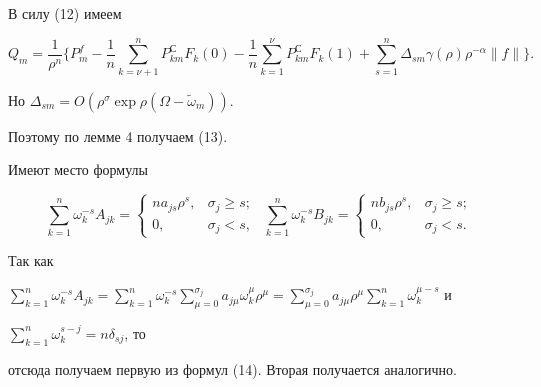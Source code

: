 \begin{pf}


В силу (12) имеем


$$


Q_m= \frac 1{\rho^n}\bigg\{P_m^f- \frac 1n\sum\limits_{k=\nu+1}^nP


_{km}^СF_k(0)- \frac 1n\sum\limits_{k=1}^{\nu}P_{km}^СF_k(1)+


\sum\limits_{s=1}^n\Delta_{sm}\gamma(\rho)\rho^{-\alpha}


\|f\|\bigg\}.


$$


Но $\Delta_{sm}=O(\rho^\sigma\exp\rho(\Omega-\widetilde\omega_m))$.


Поэтому по лемме 4 получаем (13).


\end{pf}





\begin{lem}


Имеют место формулы


\begin{equation}


\sum\limits_{k=1}^n\omega_k^{-s}A_{jk}=\begin{cases}


na_{js}\rho^s,&\sigma_j\ge s;\\ 0,&\sigma_j<s,\end{cases}


\ \ \sum\limits_{k=1}^n\omega_k^{-s}B_{jk}=\begin{cases}


nb_{js}\rho^s,&\sigma_j\ge s;\\0,&\sigma_j<s.\end{cases}


\end{equation}


\end{lem}





\begin{pf}


Так как


$\sum\limits_{k=1}^n\omega_k^{-s}A_{jk}=\sum\limits_{k=1}^n


\omega_k^{-s}\sum\limits_{\mu=0}^{\sigma_j}a_{j\mu}\omega_k^\mu


\rho^\mu=\sum\limits_{\mu=0}^{\sigma_j}a_{j\mu}\rho^\mu\sum\limits


_{k=1}^n\omega_k^{\mu-s}$ и


$\sum\limits_{k=1}^n\omega_k^{s-j}=n\delta_{sj}$, то


отсюда получаем первую из формул (14). Вторая получается аналогично.


\end{pf}





